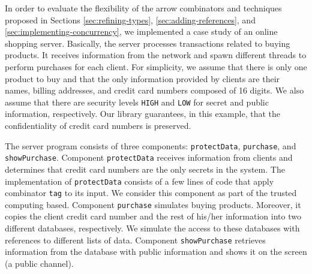 \documentclass[times, 10pt,twocolumn]{article}
\begin{document}
{In order to evaluate the 
flexibility  of the arrow combinators and techniques 
proposed in Sections \ref{sec:refining-types}, \ref{sec:adding-references},
and %
\ref{sec:implementing-concurrency}, we implemented a
case study of an online shopping server.
%
%
Basically, the server processes transactions related to
buying products. It receives information from the network 
and spawn different threads to perform 
purchases for each client. For simplicity, we assume that there is
only one product to buy and that the only information provided by
clients are their names, billing addresses, and credit card numbers
composed of 16 digits.
We also assume that there are security levels \texttt{HIGH} and 
\texttt{LOW} for secret and public information,
respectively. Our library guarantees, in this example, that the
confidentiality of credit card numbers is preserved. 

The server program consists of three components:
\texttt{protectData}, \texttt{purchase}, and 
\texttt{showPurchase}. Component \texttt{protectData} 
receives information from clients and determines that 
credit card numbers are the only secrets in the system.
The implementation of \texttt{protectData} consists of a
few lines of code that apply combinator \texttt{tag} to its input. 
We consider this component as part of the trusted 
computing based.
Component \texttt{purchase} simulates buying products. 
Moreover, it copies the client credit card number and the
rest of his/her information into two different databases, respectively.  
We simulate the access to these
databases with references to different lists of data. 
Component
\texttt{showPurchase} retrieves information from the database with
public information and shows it on the screen (a
public channel). 
%

}
\end{document}
